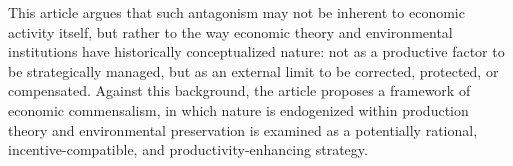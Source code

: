 This article argues that such antagonism may not be inherent to economic activity itself, but rather to the way economic theory and environmental institutions have historically conceptualized nature: not as a productive factor to be strategically managed, but as an external limit to be corrected, protected, or compensated. Against this background, the article proposes a framework of economic commensalism, in which nature is endogenized within production theory and environmental preservation is examined as a potentially rational, incentive-compatible, and productivity-enhancing strategy.

























\newpage

